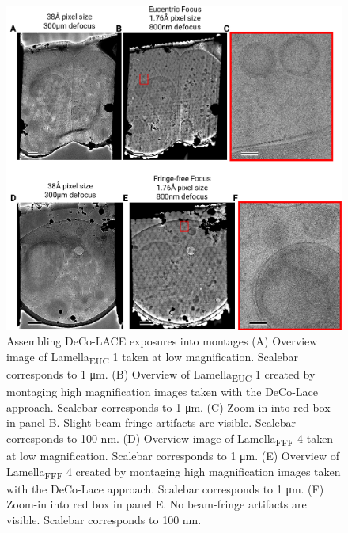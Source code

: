 \documentclass[
]{article}
\begin{document}
\begin{figure}
\hypertarget{fig:assembly}{%
\centering
\includegraphics{figures/assembly.png}
\caption{Assembling DeCo-LACE exposures into montages (A) Overview
image of Lamella\textsubscript{EUC} 1 taken at low magnification. Scalebar corresponds to 1 μm. (B) Overview of Lamella\textsubscript{EUC} 1 created by
montaging high magnification images taken with the DeCo-Lace approach. Scalebar corresponds to 1 μm. (C) Zoom-in into red box in panel B. Slight beam-fringe artifacts are visible. Scalebar corresponds to 100 nm.
(D) Overview
image of Lamella\textsubscript{FFF} 4 taken at low magnification. Scalebar corresponds to 1 μm. (E) Overview of Lamella\textsubscript{FFF} 4 created by
montaging high magnification images taken with the DeCo-Lace approach. Scalebar corresponds to 1 μm. (F) Zoom-in into red box in panel E. No beam-fringe artifacts are visible. Scalebar corresponds to 100 nm.}\label{fig:assembly}
}
\end{figure}
\end{document}
